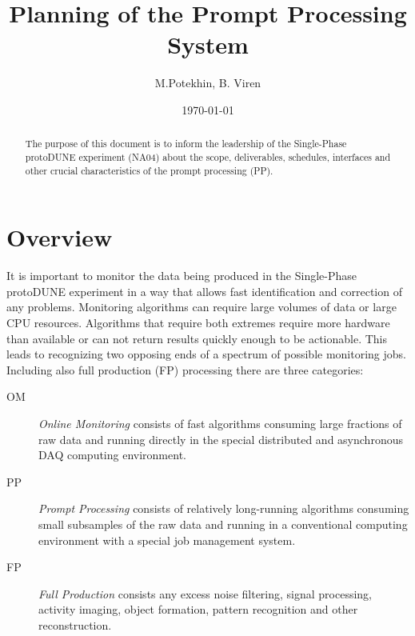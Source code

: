 \documentclass[pdftex,12pt,letter]{article}
\title{Planning of the \pd Prompt Processing System}
\date{\today}
\author{M.Potekhin, B. Viren}
\newcommand{\pd}{protoDUNE\xspace}
\begin{document}

\maketitle

\begin{abstract}
  \noindent The purpose of this document is to inform the leadership
  of the Single-Phase \pd experiment (NA04) about the scope,
  deliverables, schedules, interfaces and other crucial
  characteristics of the prompt processing (PP).
\end{abstract}

\tableofcontents

\pagebreak

\section{Overview}
It is important to monitor the data being produced in the Single-Phase
\pd experiment in a way that allows fast identification and correction
of any problems.  Monitoring algorithms can require large volumes of
data or large CPU resources.  Algorithms that require both extremes
require more hardware than available or can not return results quickly
enough to be actionable.  This leads to recognizing two opposing ends
of a spectrum of possible monitoring jobs.  Including also full
production (FP) processing there are three categories:

\begin{description}
\item[OM] \textit{Online Monitoring} consists of fast algorithms consuming large fractions of raw data and running directly in the special distributed and asynchronous DAQ computing environment.
\item[PP] \textit{Prompt Processing} consists of relatively long-running algorithms consuming small subsamples of the raw data and running in a conventional computing environment with a special job management system.
\item[FP] \textit{Full Production} consists any excess noise filtering, signal processing, activity imaging, object formation, pattern recognition and other reconstruction.
\end{description}
\end{document}
